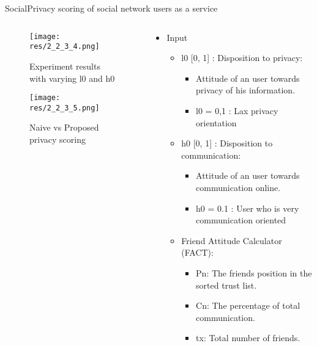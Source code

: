 \begin{frame}[noframenumbering]{Social}{Privacy scoring of social network users as a service \cite{vidyalakshmi_privacy_2015}}

	\begin{columns}
		\begin{column}{0.32\textwidth}
			\begin{center}
			
				\begin{figure}
					\texttt{[image: res/2\_2\_3\_4.png]}
					\caption{\label{fig:2_2_3_5}\tiny{Experiment results with varying l0 and h0}}
					
					\texttt{[image: res/2\_2\_3\_5.png]}
					\caption{\label{fig:2_2_3_6} \tiny{Naive vs Proposed privacy scoring}}
				\end{figure}
				
			\end{center}
		\end{column}
		
		\begin{column}{0.61\textwidth}
		
			\begin{itemize}

				\item Input
					\begin{itemize}
					
						\item l0 [0, 1] : Disposition to privacy:
							\begin{itemize}
								\item Attitude of an user towards privacy of his information.
								\item l0 = 0,1 :  Lax privacy orientation 
							\end{itemize}
							
						\item h0 [0, 1] : Disposition to communication:
							\begin{itemize}
								\item Attitude of an user towards communication online.
								\item h0 = 0.1 :  User who is very communication oriented
							\end{itemize}
						
						\item Friend Attitude Calculator (FACT):
							\begin{itemize}
								\item Pn: The friends position in the sorted trust list.
								\item Cn: The percentage of total communication.
								\item tx: Total number of friends.
							

\end{itemize}
\end{itemize}
\end{itemize}
\end{column}
\end{columns}
\end{frame}
